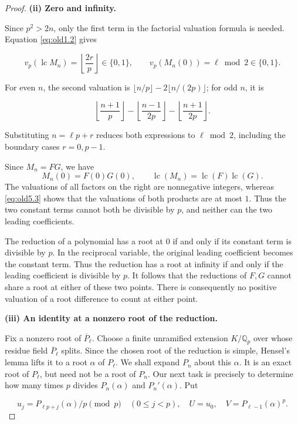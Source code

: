 \documentclass[11pt,a4paper]{article}
\numberwithin{equation}{section}
\theoremstyle{definition}
\begin{document}
\begin{proof}
\textbf{(ii) Zero and infinity.}

Since \(p^2>2n\), only the first term in the factorial valuation formula is needed. Equation \eqref{eq:old1.2} gives

\begin{equation}
v_p(\operatorname{lc}M_n)=\left\lfloor\frac{2r}{p}\right\rfloor\in\{0,1\},
\qquad v_p(M_n(0))=\ell\bmod2\in\{0,1\}.
\label{eq:old5.3}
\end{equation}

For even \(n\), the second valuation is
\(\lfloor n/p\rfloor-2\lfloor n/(2p)\rfloor\); for odd \(n\), it is

\[
\left\lfloor\frac{n+1}{p}\right\rfloor
-\left\lfloor\frac{n-1}{2p}\right\rfloor
-\left\lfloor\frac{n+1}{2p}\right\rfloor.
\]

Substituting \(n=\ell p+r\) reduces both expressions to \(\ell\bmod2\), including the boundary cases \(r=0,p-1\).

Since \(M_n=FG\), we have
\[
M_n(0)=F(0)G(0),\qquad
\operatorname{lc}(M_n)=\operatorname{lc}(F)\operatorname{lc}(G).
\]
The valuations of all factors on the right are nonnegative integers, whereas \eqref{eq:old5.3} shows that the valuations of both products are at most \(1\). Thus the two constant terms cannot both be divisible by \(p\), and neither can the two leading coefficients.

The reduction of a polynomial has a root at \(0\) if and only if its constant term is divisible by \(p\). In the reciprocal variable, the original leading coefficient becomes the constant term. Thus the reduction has a root at infinity if and only if the leading coefficient is divisible by \(p\). It follows that the reductions of \(F,G\) cannot share a root at either of these two points. There is consequently no positive valuation of a root difference to count at either point.

\textbf{(iii) An identity at a nonzero root of the reduction.}

Fix a nonzero root of \(\overline P_{\ell}\). Choose a finite unramified extension \(K/\mathbb Q_p\) over whose residue field \(\overline P_{\ell}\) splits. Since the chosen root of the reduction is simple, Hensel's lemma lifts it to a root \(\alpha\) of \(P_{\ell}\). We shall expand \(P_n\) about this \(\alpha\). It is an exact root of \(P_{\ell}\), but need not be a root of \(P_n\). Our next task is precisely to determine how many times \(p\) divides \(P_n(\alpha)\) and \(P_n'(\alpha)\). Put

\[
u_j=P_{\ell p+j}(\alpha)/p\pmod p\quad(0\le j<p),
\quad U=u_0,\quad V=P_{\ell-1}(\alpha)^p.
\]


\end{proof}
\end{document}
